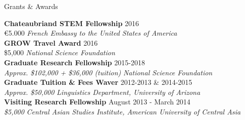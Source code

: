 \documentclass{resume} %
\begin{document}
\begin{minipage}{\textwidth}

\begin{rSection}{Grants \& Awards}
\vspace{.25cm}

{\bf Chateaubriand STEM Fellowship} \hfill {2016} \\ 
{\euro{5.000}} \hfill {\em French Embassy to the United States of America} \\


{\bf GROW Travel Award} \hfill {2016} \\ 
{\$5,000} \hfill {\em National Science Foundation} \\


{\bf Graduate Research Fellowship} \hfill {2015-2018} \\ 
{\em Approx. \$102,000 + \$36,000 (tuition)} \hfill {\em National Science Foundation} \\


{\bf Graduate Tuition \& Fees Waver} \hfill {2012-2013 \& 2014-2015} \\ 
{\em Approx. \$50,000} \hfill {\em Linguistics Department, University of Arizona} \\


{\bf Visiting Research Fellowship} \hfill {August 2013 - March 2014} \\ 
{\em \$5,000} \hfill {\em Central Asian Studies Institute, American University of Central Asia} \\


\end{rSection}
\end{minipage}
\end{document}
